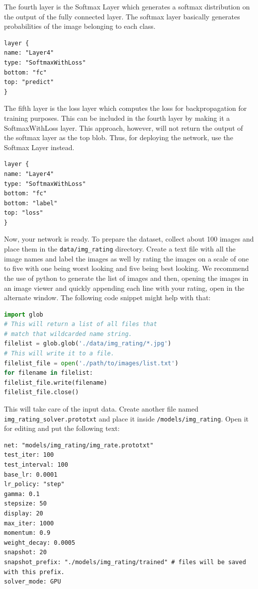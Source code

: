 \documentclass{article}
\begin{document}
The fourth layer is the Softmax Layer which generates a softmax distribution on the output of the fully connected layer. The softmax layer basically generates probabilities of the image belonging to each class.
\begin{lstlisting}[tabsize=2,breaklines=true]
layer {
name: "Layer4"
type: "SoftmaxWithLoss"
bottom: "fc"
top: "predict"
}
\end{lstlisting}
The fifth layer is the loss layer which computes the loss for backpropagation for training purposes. This can be included in the fourth layer by making it a SoftmaxWithLoss layer. This approach, however, will not return the output of the softmax layer as the top blob. Thus, for deploying the network, use the Softmax Layer instead.
\begin{lstlisting}[tabsize=2,breaklines=true]
layer {
name: "Layer4"
type: "SoftmaxWithLoss"
bottom: "fc"
bottom: "label"
top: "loss"
}
\end{lstlisting}

Now, your network is ready. To prepare the dataset, collect about 100 images and place them in the \verb|data/img_rating| directory. Create a text file with all the image names and label the images as well by rating the images on a scale of one to five with one being worst looking and five being best looking. We recommend the use of python to generate the list of images and then, opening the images in an image viewer and quickly appending each line with your rating, open in the alternate window. The following code snippet might help with that:
\begin{lstlisting}[language=Python,breaklines,showstringspaces=false]
import glob
# This will return a list of all files that
# match that wildcarded name string.
filelist = glob.glob('./data/img_rating/*.jpg')
# This will write it to a file.
filelist_file = open('./path/to/images/list.txt')
for filename in filelist:
filelist_file.write(filename)
filelist_file.close()
\end{lstlisting}

This will take care of the input data. Create another file named \verb|img_rating_solver.prototxt| and place it inside \verb|/models/img_rating|. Open it for editing and put the following text:
\begin{lstlisting}[tabsize=2,breaklines=true]
net: "models/img_rating/img_rate.prototxt" 
test_iter: 100
test_interval: 100
base_lr: 0.0001
lr_policy: "step" 
gamma: 0.1 
stepsize: 50
display: 20 
max_iter: 1000 
momentum: 0.9 
weight_decay: 0.0005 
snapshot: 20 
snapshot_prefix: "./models/img_rating/trained" # files will be saved with this prefix.
solver_mode: GPU
\end{lstlisting}
\end{document}
